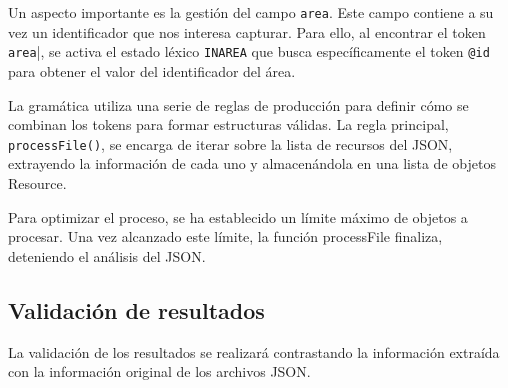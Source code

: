 Un aspecto importante es la gestión del campo \lstinline|area|. Este campo contiene a su vez un identificador que nos interesa capturar. Para ello, al encontrar el token \lstinline|area||, se activa el estado léxico \lstinline|INAREA| que busca específicamente el token \lstinline|@id| para obtener el valor del identificador del área.

La gramática utiliza una serie de reglas de producción para definir cómo se combinan los tokens para formar estructuras válidas. La regla principal, \lstinline|processFile()|, se encarga de iterar sobre la lista de recursos del JSON, extrayendo la información de cada uno y almacenándola en una lista de objetos Resource.

Para optimizar el proceso, se ha establecido un límite máximo de objetos a procesar. Una vez alcanzado este límite, la función processFile finaliza, deteniendo el análisis del JSON.





\subsection{Validación de resultados}

La validación de los resultados se realizará contrastando la información extraída con la información original de los archivos JSON. 

